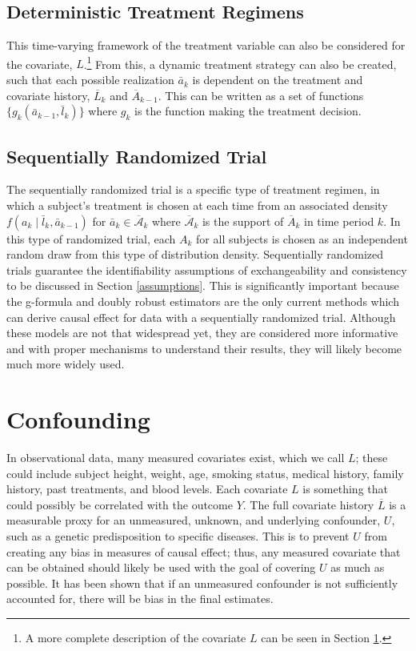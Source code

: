 \subsection{Deterministic Treatment Regimens} 
This time-varying framework of the treatment variable can also be considered for the covariate, $L$.\footnote{A more complete description of the covariate $L$ can be seen in Section \ref{confounding}.}  From this, a dynamic treatment strategy can also be created, such that each possible realization $\bar{a}_{k}$ is dependent on the treatment and covariate history, $\overline{L}_k$ and $\overline{A}_{k-1}$.  This can be written as a set of functions $\{g_k (\bar{a}_{k-1}, \bar{l}_k )\}$ where $g_k$ is the function making the treatment decision.  

\subsection{Sequentially Randomized Trial} 
The sequentially randomized trial is a specific type of treatment regimen, in which a subject's treatment is chosen at each time from an associated density $f (a_k \mid \bar{l}_k, \bar{a}_{k-1})$ for $\bar{a}_k \in \overline{\mathcal{A}}_k$ where $\overline{\mathcal{A}}_k$ is the support of $\overline{A}_k$ in time period $k$.\cite{young2011comparative}  In this type of randomized trial, each $A_k$ for all subjects is chosen as an independent random draw from this type of distribution density.  Sequentially randomized trials guarantee the identifiability assumptions of exchangeability and consistency to be discussed in Section \ref{assumptions}.  This is significantly important because the g-formula and doubly robust estimators are the only current methods which can derive causal effect for data with a sequentially randomized trial.  Although these models are not that widespread yet, they are considered more informative and with proper mechanisms to understand their results, they will likely become much more widely used.

\section{Confounding} \label{confounding}
In observational data, many measured covariates exist, which we call $L$; these could include subject height, weight, age, smoking status, medical history, family history, past treatments, and blood levels.  Each covariate $L$ is something that could possibly be correlated with the outcome $Y$. The full covariate history $\overline{L}$ is a measurable proxy for an unmeasured, unknown, and underlying confounder, $U$, such as a genetic predisposition to specific diseases.  This is to prevent $U$ from creating any bias in measures of causal effect; thus, any measured covariate that can be obtained should likely be used with the goal of covering $U$ as much as possible. It has been shown that if an unmeasured confounder is not sufficiently accounted for, there will be bias in the final estimates.\cite{vanderweele2011unmeasured}

